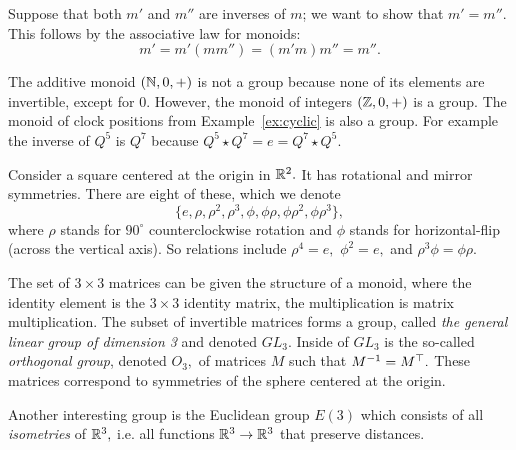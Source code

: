 \documentclass[CT4S-EN-RU]{subfiles}
\begin{document}
\begin{propositionRUS}
\end{propositionRUS}

\begin{proofENG}
Suppose that both $m'$ and $m''$ are inverses of $m$; we want to show that $m'=m''.$ This follows by the associative law for monoids:
$$m'=m'(mm'')=(m'm)m''=m''.$$
\end{proofENG}

\begin{proofRUS}
\end{proofRUS}

\begin{exampleENG}
The additive monoid $({\mathbb N},0,+)$ is not a group because none of its elements are invertible, except for $0.$ However, the monoid of integers $({\mathbb Z},0,+)$ is a group. The monoid of clock positions from Example~\ref{ex:cyclic} is also a group. For example the inverse of $Q^5$ is $Q^7$ because $Q^5\star Q^7=e=Q^7\star Q^5.$
\end{exampleENG}

\begin{exampleRUS}
\end{exampleRUS}

\begin{exampleENG}
Consider a square centered at the origin in ${\mathbb R}^2.$ It has rotational and mirror symmetries. There are eight of these, which we denote $$\{e,\rho,\rho^2,\rho^3,\phi,\phi\rho,\phi\rho^2,\phi\rho^3\},$$ where $\rho$ stands for $90^\circ$ counterclockwise rotation and $\phi$ stands for horizontal-flip (across the vertical axis). So relations include $\rho^4=e,$ $\phi^2=e,$ and $\rho^3\phi=\phi\rho.$
\end{exampleENG}

\begin{exampleRUS}
\end{exampleRUS}

\begin{exampleENG}\label{ex:important groups}
The set of $3\times 3$ matrices can be given the structure of a monoid, where the identity element is the $3\times 3$ identity matrix, the multiplication is matrix multiplication. The subset of invertible matrices forms a group, called {\em the general linear group of dimension 3} and denoted $GL_3.$ Inside of $GL_3$ is the so-called {\em orthogonal group}, denoted $O_3,$ of matrices $M$ such that $M^\m1=M^\top.$ These matrices correspond to symmetries of the sphere centered at the origin.

Another interesting group is the Euclidean group $E(3)$ which consists of all {\em isometries} of ${\mathbb R}^3,$ i.e. all functions ${\mathbb R}^3\rightarrow{\mathbb R}^3$ that preserve distances.  
\end{exampleENG}
\end{document}
